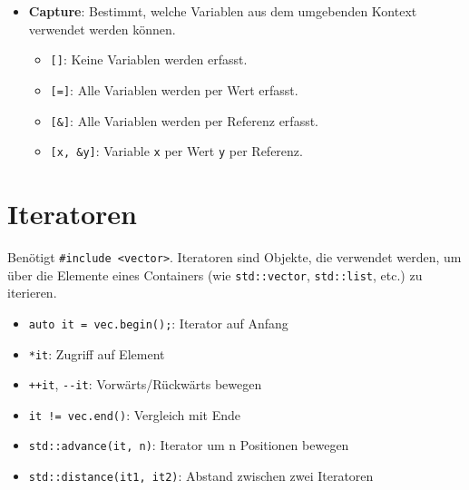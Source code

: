 \documentclass[9pt, a3paper, landscape]{article}
\begin{document}
\begin{multicols*}{4}
\begin{itemize}
    \item \textbf{Capture}: Bestimmt, welche Variablen aus dem umgebenden Kontext verwendet werden können.
    \begin{itemize}
        \item \lstinline|[]|: Keine Variablen werden erfasst.
        \item \lstinline|[=]|: Alle Variablen werden per Wert erfasst.
        \item \lstinline|[&]|: Alle Variablen werden per Referenz erfasst.
        \item \lstinline|[x, &y]|: Variable \lstinline|x| per Wert \lstinline|y| per Referenz.
    \end{itemize}
\end{itemize}

\section{Iteratoren}
Benötigt \lstinline|#include <vector>|. 
Iteratoren sind Objekte, die verwendet werden, um über die Elemente eines Containers (wie \lstinline|std::vector|, \lstinline|std::list|, etc.) zu iterieren. 
\begin{itemize}
    \item \lstinline|auto it = vec.begin();|: Iterator auf Anfang
    \item \lstinline|*it|: Zugriff auf Element
    \item \lstinline|++it|, \lstinline|--it|: Vorwärts/Rückwärts bewegen
    \item \lstinline|it != vec.end()|: Vergleich mit Ende
    \item \lstinline|std::advance(it, n)|: Iterator um n Positionen bewegen
    \item \lstinline|std::distance(it1, it2)|: Abstand zwischen zwei Iteratoren
\end{itemize}



\end{multicols*}
\end{document}
